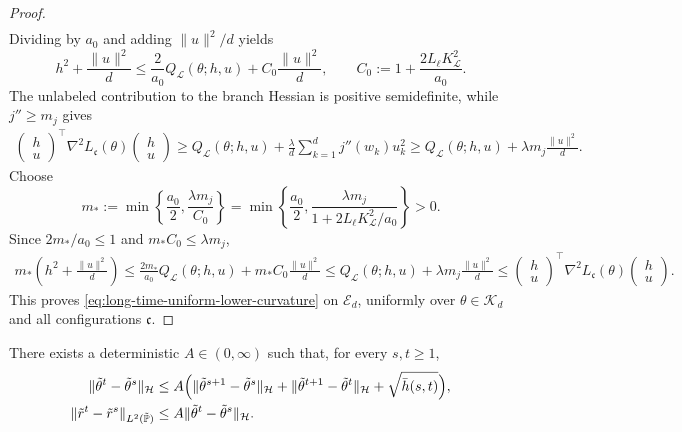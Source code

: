 \begin{proof}
\begin{align*}
\end{align*}
Dividing by $a_0$ and adding $\|u\|^2/d$ yields
\[
    h^2+\frac{\|u\|^2}{d}
    \leq
    \frac2{a_0}Q_{\mathcal L}(\theta;h,u)
    +C_0\frac{\|u\|^2}{d},
    \qquad
    C_0:=1+\frac{2L_\ell K_{\mathcal L}^2}{a_0}.
\]
The unlabeled contribution to the branch Hessian is positive
semidefinite, while $j''\geq m_j$ gives
\[
\begin{aligned}
    \begin{pmatrix}h\\u\end{pmatrix}^{\!\top}
    \nabla^2L_{\mathfrak c}(\theta)
    \begin{pmatrix}h\\u\end{pmatrix}
    \geq
    Q_{\mathcal L}(\theta;h,u)
    +\frac{\lambda}{d}\sum_{k=1}^d j''(w_k)u_k^2
    \geq
    Q_{\mathcal L}(\theta;h,u)
    +\lambda m_j\frac{\|u\|^2}{d}.
\end{aligned}
\]
Choose
\[
    m_*:=
    \min\left\{
        \frac{a_0}{2},
        \frac{\lambda m_j}{C_0}
    \right\}
    =
    \min\left\{
        \frac{a_0}{2},
        \frac{\lambda m_j}
             {1+2L_\ell K_{\mathcal L}^2/a_0}
    \right\}>0.
\]
Since $2m_*/a_0\leq1$ and $m_*C_0\leq\lambda m_j$,
\[
\begin{aligned}
    m_*\left(h^2+\frac{\|u\|^2}{d}\right)
    \leq
    \frac{2m_*}{a_0}Q_{\mathcal L}(\theta;h,u)
    +m_*C_0\frac{\|u\|^2}{d}
    \leq
    Q_{\mathcal L}(\theta;h,u)
    +\lambda m_j\frac{\|u\|^2}{d}
    \leq
    \begin{pmatrix}h\\u\end{pmatrix}^{\!\top}
    \nabla^2L_{\mathfrak c}(\theta)
    \begin{pmatrix}h\\u\end{pmatrix}.
\end{aligned}
\]
This proves
\eqref{eq:long-time-uniform-lower-curvature}
on $\mathcal E_d$, uniformly over
$\theta\in\mathcal K_d$ and all configurations $\mathfrak c$.
\end{proof}

\begin{lemma}
\label{lem:effective-two-time-stability}
There exists a deterministic $A\in(0,\infty)$ such that,
for every $s,t\geq1$,
\begin{align}
    \|\tilde\theta^t-\tilde\theta^s\|_{\mathcal H}
    &\leq A\Bigl(
        \|\tilde\theta^{s+1}-\tilde\theta^s\|_{\mathcal H}
        +\|\tilde\theta^{t+1}-\tilde\theta^t\|_{\mathcal H}
        +\sqrt{\bar h(s,t)}\Bigr),
    \label{eq:effective-two-time-stability-main}\\
    \|\tilde r^t-\tilde r^s\|_{L^2(\tilde{\mathbb P})}
    &\leq A\|\tilde\theta^t-\tilde\theta^s\|_{\mathcal H}.
    \label{eq:effective-score-stability-main}
\end{align}
\end{lemma}

